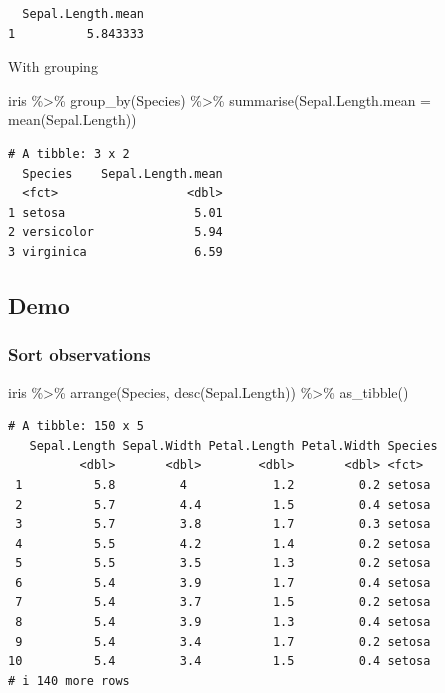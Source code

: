 \documentclass[
  letterpaper,
  DIV=11,
  numbers=noendperiod]{scrartcl}
\newenvironment{Shaded}{\begin{snugshade}}{\end{snugshade}}
\newcommand{\AttributeTok}[1]{\textcolor[rgb]{0.40,0.45,0.13}{#1}}
\newcommand{\FunctionTok}[1]{\textcolor[rgb]{0.28,0.35,0.67}{#1}}
\newcommand{\NormalTok}[1]{\textcolor[rgb]{0.00,0.23,0.31}{#1}}
\newcommand{\SpecialCharTok}[1]{\textcolor[rgb]{0.37,0.37,0.37}{#1}}
\begin{document}
\begin{verbatim}
  Sepal.Length.mean
1          5.843333
\end{verbatim}

With grouping

\begin{Shaded}
\begin{Highlighting}[]
\NormalTok{iris }\SpecialCharTok{\%\textgreater{}\%}
    \FunctionTok{group\_by}\NormalTok{(Species) }\SpecialCharTok{\%\textgreater{}\%}
    \FunctionTok{summarise}\NormalTok{(}\AttributeTok{Sepal.Length.mean =} \FunctionTok{mean}\NormalTok{(Sepal.Length))}
\end{Highlighting}
\end{Shaded}

\begin{verbatim}
# A tibble: 3 x 2
  Species    Sepal.Length.mean
  <fct>                  <dbl>
1 setosa                  5.01
2 versicolor              5.94
3 virginica               6.59
\end{verbatim}

\subsection{Demo}\label{demo-8}

\subsubsection{Sort observations}\label{sort-observations}

\begin{Shaded}
\begin{Highlighting}[]
\NormalTok{iris }\SpecialCharTok{\%\textgreater{}\%}
    \FunctionTok{arrange}\NormalTok{(Species, }\FunctionTok{desc}\NormalTok{(Sepal.Length)) }\SpecialCharTok{\%\textgreater{}\%}
    \FunctionTok{as\_tibble}\NormalTok{()}
\end{Highlighting}
\end{Shaded}

\begin{verbatim}
# A tibble: 150 x 5
   Sepal.Length Sepal.Width Petal.Length Petal.Width Species
          <dbl>       <dbl>        <dbl>       <dbl> <fct>  
 1          5.8         4            1.2         0.2 setosa 
 2          5.7         4.4          1.5         0.4 setosa 
 3          5.7         3.8          1.7         0.3 setosa 
 4          5.5         4.2          1.4         0.2 setosa 
 5          5.5         3.5          1.3         0.2 setosa 
 6          5.4         3.9          1.7         0.4 setosa 
 7          5.4         3.7          1.5         0.2 setosa 
 8          5.4         3.9          1.3         0.4 setosa 
 9          5.4         3.4          1.7         0.2 setosa 
10          5.4         3.4          1.5         0.4 setosa 
# i 140 more rows
\end{verbatim}
\end{document}
